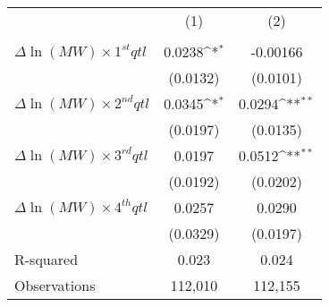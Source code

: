 {
\def\sym#1{\ifmmode^{#1}\else\(^{#1}\)\fi}
\begin{tabular}{l*{2}{c}}
\hline\hline
          &&\\
          &&\\
\hline
$\Delta \ln(MW) \times 1^{st} qtl$&   0.0238\sym{*}  & -0.00166         \\
          & (0.0132)         & (0.0101)         \\
[1em]
$\Delta \ln(MW) \times 2^{nd} qtl$&   0.0345\sym{*}  &   0.0294\sym{**} \\
          & (0.0197)         & (0.0135)         \\
[1em]
$\Delta \ln(MW) \times 3^{rd} qtl$&   0.0197         &   0.0512\sym{**} \\
          & (0.0192)         & (0.0202)         \\
[1em]
$\Delta \ln(MW) \times 4^{th} qtl$&   0.0257         &   0.0290         \\
          & (0.0329)         & (0.0197)         \\
\hline
R-squared &    0.023         &    0.024         \\
Observations&  112,010         &  112,155         \\
\hline\hline
\end{tabular}
}
